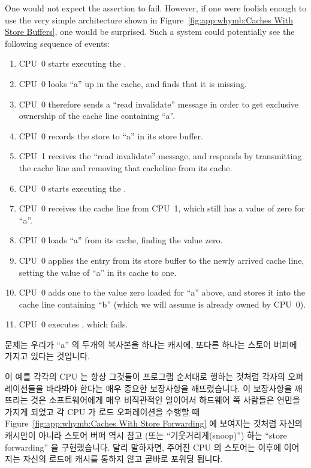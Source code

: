 One would not expect the assertion to fail.
However, if one were foolish enough to use the very simple architecture
shown in
Figure~\ref{fig:app:whymb:Caches With Store Buffers},
one would be surprised.
Such a system could potentially see the following sequence of events:
\begin{enumerate}
\item	CPU~0 starts executing the .
\item	CPU~0 looks ``a'' up in the cache, and finds that it is missing.
\item	CPU~0 therefore sends a ``read invalidate'' message in order to
	get exclusive ownership of the cache line containing ``a''.
\item	CPU~0 records the store to ``a'' in its store buffer.
\item	CPU~1 receives the ``read invalidate'' message, and responds
	by transmitting the cache line and removing that cacheline from
	its cache.
\item	CPU~0 starts executing the .
\item	CPU~0 receives the cache line from CPU~1, which still has
	a value of zero for ``a''.
\item	CPU~0 loads ``a'' from its cache, finding the value zero.
	\label{item:app:whymb:Need Store Buffer}
\item	CPU~0 applies the entry from its store buffer to the newly
	arrived cache line, setting the value of ``a'' in its cache
	to one.
\item	CPU~0 adds one to the value zero loaded for ``a'' above,
	and stores it into the cache line containing ``b''
	(which we will assume is already owned by CPU~0).
\item	CPU~0 executes , which fails.
\end{enumerate}
\fi

문제는 우리가 ``a'' 의 두개의 복사본을 하나는 캐시에, 또다른 하나는 스토어
버퍼에 가지고 있다는 것입니다.

이 예를 각각의 CPU 는 항상 그것들이 프로그램 순서대로 행하는 것처럼 각자의
오퍼레이션들을 바라봐야 한다는 매우 중요한 보장사항을 깨뜨렸습니다.
이 보장사항을 깨뜨리는 것은 소프트웨어에게 매우 비직관적인 일이어서 하드웨어 쪽
사람들은 연민을 가지게 되었고 각 CPU 가 로드 오퍼레이션을 수행할 때
Figure~\ref{fig:app:whymb:Caches With Store Forwarding} 에 보여지는 것처럼
자신의 캐시만이 아니라 스토어 버퍼 역시 참고 (또는 ``기웃거리게(snoop)'') 하는
``store forwarding'' 을 구현했습니다.
달리 말하자면, 주어진 CPU 의 스토어는 이후에 이어지는 자신의 로드에 캐시를
통하지 않고 곧바로 포워딩 됩니다.
\iffalse

